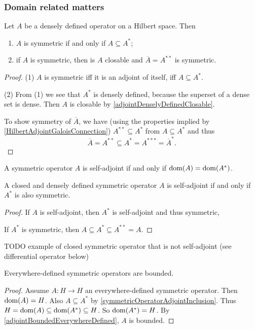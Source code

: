 \subsubsection{Domain related matters}
\begin{lemma} \label{symmetricOperatorAdjointInclusion}
Let $A$ be a densely defined operator on a Hilbert space. Then
\begin{enumerate}
\item $A$ is symmetric \textup{if and only if} $A\subseteq A^*$;
\item if $A$ is symmetric, then is $A$ closable and $\overline{A} = A^{**}$ is symmetric.
\end{enumerate}
\end{lemma}
\begin{proof}
(1) $A$ is symmetric iff it is an adjoint of itself, iff $A\subseteq A^*$.

(2) From (1) we see that $A^*$ is densely defined, because the superset of a dense set is dense. Then $A$ is closable by \ref{adjointDenselyDefinedClosable}.

To show symmetry of $\overline{A}$, we have (using the properties implied by \ref{HilbertAdjointGaloisConnection}) $A^{**}\subseteq A^*$ from $A\subseteq A^*$ and thus
\[ \overline{A} = A^{**} \subseteq A^* = A^{***} = \overline{A}^*. \]
\end{proof}

A symmetric operator $A$ is self-adjoint if and only if $\operatorname{dom}(A) = \operatorname{dom}(A^*)$.

\begin{corollary}
A closed and densely defined symmetric operator $A$ is self-adjoint \textup{if and only if} $A^*$ is also symmetric.
\end{corollary}
\begin{proof}
If $A$ is self-adjoint, then $A^*$ is self-adjoint and thus symmetric,

If $A^*$ is symmetric, then $A\subseteq A^* \subseteq A^{**} = A$.
\end{proof}

\begin{example}
TODO example of closed symmetric operator that is not self-adjoint (see differential operator below)
\end{example}

\begin{theorem} \label{HellingerToeplitz}
Everywhere-defined symmetric operators are bounded.
\end{theorem}
\begin{proof}
Assume $A: H\to H$ an everywhere-defined symmetric operator. Then $\operatorname{dom}(A) = H$. Also $A\subseteq A^*$ by \ref{symmetricOperatorAdjointInclusion}. Thus $H = \operatorname{dom}(A) \subseteq \operatorname{dom}(A^*) \subseteq H$. So $\operatorname{dom}(A^*) = H$. By \ref{adjointBoundedEverywhereDefined}, $A$ is bounded. 
\end{proof}

